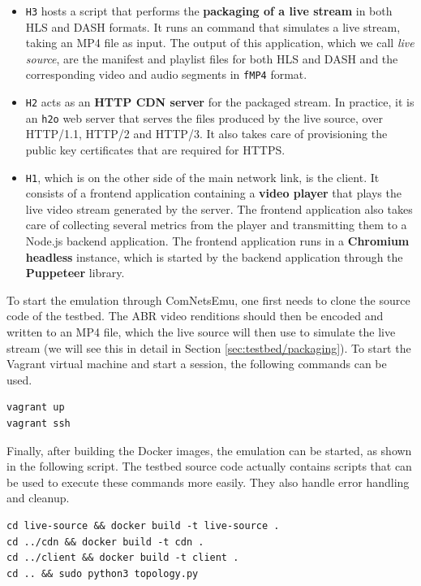 \begin{itemize}
    \item \texttt{H3} hosts a script that performs the \textbf{packaging of a live stream} in both HLS and DASH formats. It runs an \ffmpeg{} command that simulates a live stream, taking an MP4 file as input. The output of this application, which we call \textit{live source}, are the manifest and playlist files for both HLS and DASH and the corresponding video and audio segments in \texttt{fMP4} format.
    \item \texttt{H2} acts as an \textbf{HTTP CDN server} for the packaged stream. In practice, it is an \texttt{h2o} web server that serves the files produced by the live source, over HTTP/1.1, HTTP/2 and HTTP/3. It also takes care of provisioning the public key certificates that are required for HTTPS.
    \item \texttt{H1}, which is on the other side of the main network link, is the client. It consists of a frontend application containing a \textbf{video player} that plays the live video stream generated by the server. The frontend application also takes care of collecting several metrics from the player and transmitting them to a Node.js backend application. The frontend application runs in a \textbf{Chromium headless} instance, which is started by the backend application through the \textbf{Puppeteer} library.
\end{itemize}

To start the emulation through ComNetsEmu, one first needs to clone the source code of the testbed. The ABR video renditions should then be encoded and written to an MP4 file, which the live source will then use to simulate the live stream (we will see this in detail in Section \ref{sec:testbed/packaging}). To start the Vagrant virtual machine and start a session, the following commands can be used.

\begin{verbatim}
vagrant up
vagrant ssh
\end{verbatim}

Finally, after building the Docker images, the emulation can be started, as shown in the following script. The testbed source code actually contains scripts that can be used to execute these commands more easily. They also handle error handling and cleanup.

\begin{verbatim}
cd live-source && docker build -t live-source .
cd ../cdn && docker build -t cdn .
cd ../client && docker build -t client .
cd .. && sudo python3 topology.py
\end{verbatim}

